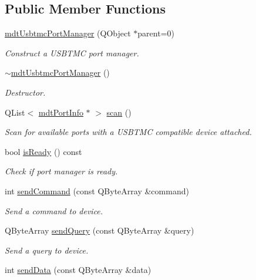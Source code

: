 \subsection*{Public Member Functions}
\begin{DoxyCompactItemize}
\item 
\hyperlink{classmdt_usbtmc_port_manager_a99a24e4360e70ffc63677dbe888513f7}{mdtUsbtmcPortManager} (QObject $\ast$parent=0)
\begin{DoxyCompactList}\small\item\em Construct a USBTMC port manager. \end{DoxyCompactList}\item 
\hyperlink{classmdt_usbtmc_port_manager_aad6b2eef9b5cfb5c324affb6962a463b}{$\sim$mdtUsbtmcPortManager} ()
\begin{DoxyCompactList}\small\item\em Destructor. \end{DoxyCompactList}\item 
QList$<$ \hyperlink{classmdt_port_info}{mdtPortInfo} $\ast$ $>$ \hyperlink{classmdt_usbtmc_port_manager_a992d1227810186d3c7dc166452e2e3b6}{scan} ()
\begin{DoxyCompactList}\small\item\em Scan for available ports with a USBTMC compatible device attached. \end{DoxyCompactList}\item 
bool \hyperlink{classmdt_usbtmc_port_manager_a0b90ceb0bbf424222ec878a355d206d7}{isReady} () const 
\begin{DoxyCompactList}\small\item\em Check if port manager is ready. \end{DoxyCompactList}\item 
int \hyperlink{classmdt_usbtmc_port_manager_af6abc4a3693fc386a12f346f57282c11}{sendCommand} (const QByteArray \&command)
\begin{DoxyCompactList}\small\item\em Send a command to device. \end{DoxyCompactList}\item 
QByteArray \hyperlink{classmdt_usbtmc_port_manager_acbbb8539c54034989b2ea6f6071e90bf}{sendQuery} (const QByteArray \&query)
\begin{DoxyCompactList}\small\item\em Send a query to device. \end{DoxyCompactList}\item 
int \hyperlink{classmdt_usbtmc_port_manager_a6d566c68ddeb7c7ca14b5c70ae784efc}{sendData} (const QByteArray \&data)

\end{DoxyCompactItemize}
